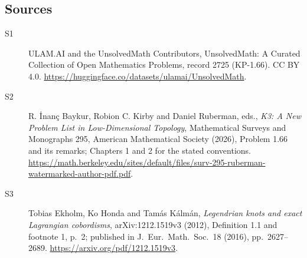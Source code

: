\documentclass[11pt]{article}
\begin{document}
\subsection{Sources}
\begin{description}
\item[\hypertarget{source:2725:1}{S1}] ULAM.AI and the UnsolvedMath Contributors, UnsolvedMath: A Curated Collection of Open Mathematics Problems, record 2725 (KP-1.66). CC BY 4.0. \url{https://huggingface.co/datasets/ulamai/UnsolvedMath}.
\item[\hypertarget{source:2725:2}{S2}] R. İnanç Baykur, Robion C. Kirby and Daniel Ruberman, eds., \emph{K3: A New Problem List in Low-Dimensional Topology}, Mathematical Surveys and Monographs 295, American Mathematical Society (2026), Problem 1.66 and its remarks; Chapters 1 and 2 for the stated conventions. \url{https://math.berkeley.edu/sites/default/files/surv-295-ruberman-watermarked-author-pdf.pdf}.
\item[\hypertarget{source:2725:3}{S3}] Tobias Ekholm, Ko Honda and Tamás Kálmán, \emph{Legendrian knots and exact Lagrangian cobordisms}, arXiv:1212.1519v3 (2012), Definition 1.1 and footnote 1, p.\ 2; published in J.\ Eur.\ Math.\ Soc.\ 18 (2016), pp.\ 2627--2689. \url{https://arxiv.org/pdf/1212.1519v3}.
\end{description}
\label{end:2725}
\end{document}
